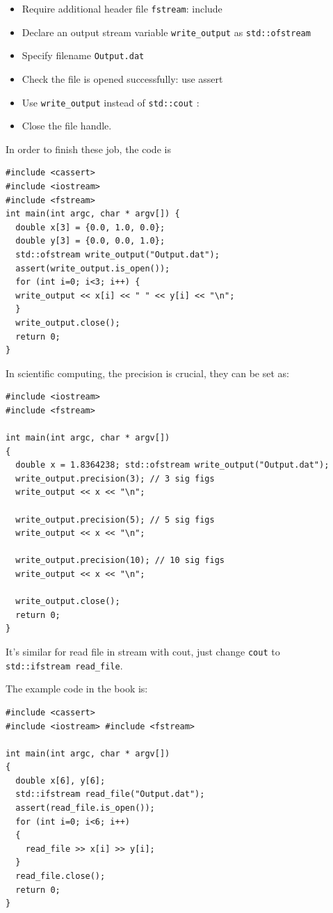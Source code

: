 \documentclass[
]{book}
\providecommand{\tightlist}{%
  \setlength{\itemsep}{0pt}\setlength{\parskip}{0pt}}
\theoremstyle{definition}
\theoremstyle{definition}
\theoremstyle{definition}
\theoremstyle{remark}
\begin{document}
\begin{itemize}
\tightlist
\item
  Require additional header file \texttt{fstream}: include
\item
  Declare an output stream variable \texttt{write\_output} as \texttt{std::ofstream}
\item
  Specify filename \texttt{Output.dat}
\item
  Check the file is opened successfully: use assert
\item
  Use \texttt{write\_output} instead of \texttt{std::cout} :
\item
  Close the file handle.
\end{itemize}

In order to finish these job, the code is

\begin{verbatim}
#include <cassert> 
#include <iostream> 
#include <fstream>
int main(int argc, char * argv[]) {
  double x[3] = {0.0, 1.0, 0.0}; 
  double y[3] = {0.0, 0.0, 1.0}; 
  std::ofstream write_output("Output.dat"); 
  assert(write_output.is_open()); 
  for (int i=0; i<3; i++) { 
  write_output << x[i] << " " << y[i] << "\n"; 
  } 
  write_output.close(); 
  return 0;
}
\end{verbatim}

In scientific computing, the precision is crucial, they can be set as:

\begin{verbatim}
#include <iostream> 
#include <fstream>

int main(int argc, char * argv[])
{
  double x = 1.8364238; std::ofstream write_output("Output.dat"); 
  write_output.precision(3); // 3 sig figs 
  write_output << x << "\n"; 

  write_output.precision(5); // 5 sig figs 
  write_output << x << "\n"; 

  write_output.precision(10); // 10 sig figs 
  write_output << x << "\n"; 

  write_output.close(); 
  return 0;
}
\end{verbatim}

It's similar for read file in stream with cout, just change \texttt{cout} to \texttt{std::ifstream\ read\_file}.

The example code in the book is:

\begin{verbatim}
#include <cassert> 
#include <iostream> #include <fstream>

int main(int argc, char * argv[]) 
{
  double x[6], y[6]; 
  std::ifstream read_file("Output.dat"); 
  assert(read_file.is_open()); 
  for (int i=0; i<6; i++) 
  { 
    read_file >> x[i] >> y[i]; 
  } 
  read_file.close(); 
  return 0;
}
\end{verbatim}
\end{document}
